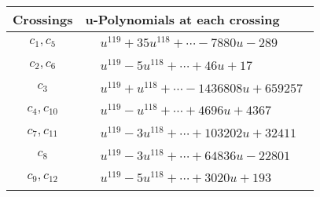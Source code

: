 \documentclass[1p]{elsarticle_modified}
\theoremstyle{definition}
\begin{document}
\begin{tabular}{m{50pt}|m{274pt}}
Crossings & \hspace{64pt}u-Polynomials at each crossing \\
\hline $$\begin{aligned}c_{1},c_{5}\end{aligned}$$&$\begin{aligned}
&u^{119}+35 u^{118}+\cdots-7880 u-289
\end{aligned}$\\
\hline $$\begin{aligned}c_{2},c_{6}\end{aligned}$$&$\begin{aligned}
&u^{119}-5 u^{118}+\cdots+46 u+17
\end{aligned}$\\
\hline $$\begin{aligned}c_{3}\end{aligned}$$&$\begin{aligned}
&u^{119}+u^{118}+\cdots-1436808 u+659257
\end{aligned}$\\
\hline $$\begin{aligned}c_{4},c_{10}\end{aligned}$$&$\begin{aligned}
&u^{119}- u^{118}+\cdots+4696 u+4367
\end{aligned}$\\
\hline $$\begin{aligned}c_{7},c_{11}\end{aligned}$$&$\begin{aligned}
&u^{119}-3 u^{118}+\cdots+103202 u+32411
\end{aligned}$\\
\hline $$\begin{aligned}c_{8}\end{aligned}$$&$\begin{aligned}
&u^{119}-3 u^{118}+\cdots+64836 u-22801
\end{aligned}$\\
\hline $$\begin{aligned}c_{9},c_{12}\end{aligned}$$&$\begin{aligned}
&u^{119}-5 u^{118}+\cdots+3020 u+193
\end{aligned}$\\
\hline
\end{tabular}\\~\\
\end{document}

